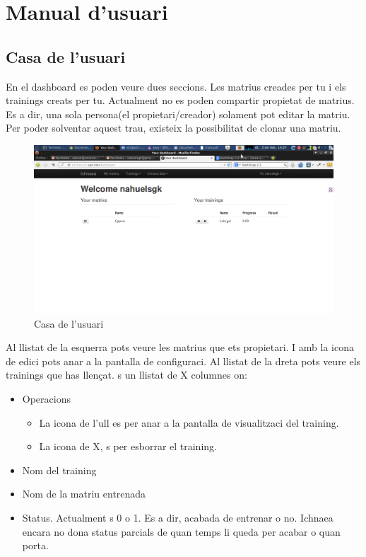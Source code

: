 \chapter*{Manual d'usuari}
\label{cha:userguide}

\section{Casa de l'usuari}
\label{sec:home}
En el dashboard es poden veure dues seccions. Les matrius creades per tu i els trainings creats per tu. Actualment no es poden compartir propietat de matrius. Es a dir, una sola persona(el propietari/creador) solament pot editar la matriu. Per poder solventar aquest trau, existeix la possibilitat de clonar una matriu.
\begin{figure}[h!]
  \centering
  \includegraphics[scale=0.2]{img/userguide/dashboard.png}
  \caption{Casa de l'usuari}
  \label{fig:placement}
\end{figure} 
Al llistat de la esquerra pots veure les matrius que ets propietari. I amb la icona de edici pots anar a la pantalla de configuraci.
Al llistat de la dreta pots veure els trainings que has llençat.  s un llistat de X columnes on:
\begin{itemize}
\item Operacions
 \begin{itemize}
 \item La icona de l'ull es per anar a la pantalla de visualitzaci del training.
 \item La icona de X, s per esborrar el training.
 \end{itemize}
\item Nom del training
\item Nom de la matriu entrenada
\item Status. Actualment s 0 o 1. Es a dir, acabada de entrenar o no. Ichnaea encara no dona status parcials de quan temps li queda per acabar o quan porta.
\end{itemize}

